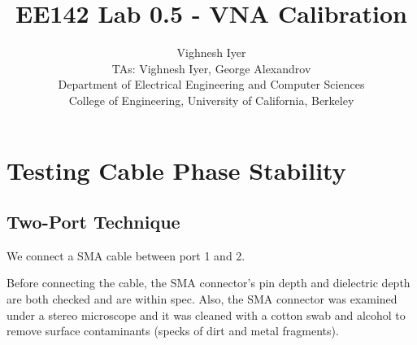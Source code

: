 \documentclass[11pt]{article}
\begin{document}
\title{EE142 Lab 0.5 - VNA Calibration}

\author{Vighnesh Iyer \\
TAs: Vighnesh Iyer, George Alexandrov \\Department of Electrical Engineering and Computer Sciences\\
College of Engineering, University of California, Berkeley}
\date{}
\maketitle

\section{Testing Cable Phase Stability}

\subsection{Two-Port Technique}
We connect a SMA cable between port 1 and 2. 

Before connecting the cable, the SMA connector's pin depth and dielectric depth are both checked and are within spec. Also, the SMA connector was examined under a stereo microscope and it was cleaned with a cotton swab and alcohol to remove surface contaminants (specks of dirt and metal fragments).
\end{document}
